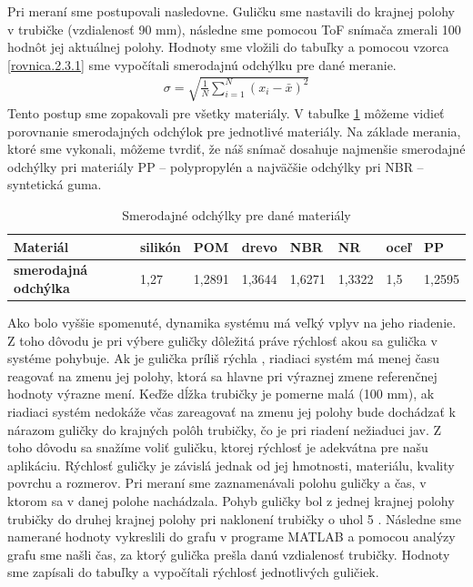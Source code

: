 Pri meraní sme postupovali nasledovne. Guličku sme nastavili do krajnej polohy v trubičke (vzdialenosť 90 mm), následne sme pomocou ToF snímača zmerali 100 hodnôt jej aktuálnej polohy. Hodnoty sme vložili do tabuľky a pomocou vzorca \ref{rovnica.2.3.1} sme vypočítali smerodajnú odchýlku pre dané meranie.
\begin{align}
	\label{rovnica.2.3.1}
	\sigma = \sqrt{\frac{1}{N}\sum_{i=1}^{N}(x_i-\bar{x})^{2}}
\end{align} Tento postup sme zopakovali pre všetky materiály. V tabuľke \ref{TABULKA_2_1} môžeme vidieť porovnanie smerodajných odchýlok pre jednotlivé materiály. Na základe merania, ktoré sme vykonali, môžeme tvrdiť, že náš snímač dosahuje najmenšie smerodajné odchýlky pri materiály PP – polypropylén a najväčšie odchýlky pri NBR – syntetická guma. 


\begin{table}[ht]
	\centering
    \begin{tabular}{|l|l|l|l|l|l|l|l|}
    	\hline
    	\textbf{Materiál}            & silikón & POM    & drevo  & NBR                            & NR     & oceľ & PP                             \\ \hline
    	\textbf{smerodajná odchýlka} & 1,27    & 1,2891 & 1,3644 & \cellcolor[HTML]{FFCCC9}1,6271 & 1,3322 & 1,5  & \cellcolor[HTML]{9AFF99}1,2595 \\ \hline
    \end{tabular}
	
    \caption{Smerodajné odchýlky pre dané materiály}
    \label{TABULKA_2_1}
\end{table}
Ako bolo vyššie spomenuté, dynamika systému má veľký vplyv na jeho riadenie. Z toho dôvodu je pri výbere guličky dôležitá práve rýchlosť akou sa gulička v systéme pohybuje. Ak je gulička príliš rýchla  , riadiaci systém má menej času reagovať na zmenu jej polohy, ktorá sa hlavne pri výraznej zmene referenčnej hodnoty výrazne mení. Keďže dĺžka trubičky je pomerne malá (100 mm), ak riadiaci systém nedokáže včas zareagovať  na zmenu jej polohy bude dochádzať k nárazom guličky do krajných polôh trubičky, čo je pri riadení nežiaduci jav. Z toho dôvodu sa snažíme voliť guličku, ktorej rýchlosť je adekvátna pre našu aplikáciu. Rýchlosť guličky je závislá jednak od jej hmotnosti, materiálu, kvality povrchu a rozmerov.
Pri meraní sme zaznamenávali polohu guličky a čas, v ktorom sa v danej polohe nachádzala. Pohyb guličky bol z jednej krajnej polohy trubičky do druhej krajnej polohy pri naklonení trubičky o uhol 5 \degree. Následne sme namerané hodnoty vykreslili do grafu v programe MATLAB a pomocou analýzy grafu sme našli čas, za ktorý gulička prešla danú vzdialenosť trubičky. Hodnoty sme zapísali do tabuľky a vypočítali rýchlosť jednotlivých guličiek.

